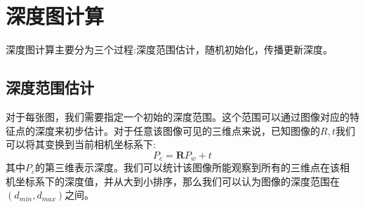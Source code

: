 \section{深度图计算}
深度图计算主要分为三个过程:深度范围估计，随机初始化，传播更新深度。
\subsection{深度范围估计}
对于每张图，我们需要指定一个初始的深度范围。这个范围可以通过图像对应的特征点的深度来初步估计。对于任意该图像可见的三维点来说，已知图像的$R,t$我们可以将其变换到当前相机坐标系下:
\begin{equation}
	P_c = \boldsymbol{R}P_w+t
\end{equation}
其中$P_c$的第三维表示深度。我们可以统计该图像所能观察到所有的三维点在该相机坐标系下的深度值，并从大到小排序，那么我们可以认为图像的深度范围在$(d_{min},d_{max})$之间。
